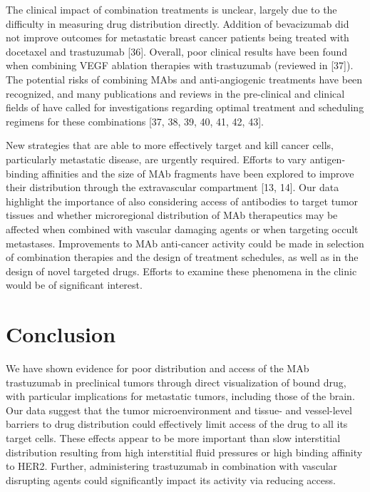 The clinical impact of combination treatments is unclear, largely due to the difficulty in measuring drug distribution directly.
Addition of bevacizumab did not improve outcomes for metastatic breast cancer patients being treated with docetaxel and trastuzumab [36].
Overall, poor clinical results have been found when combining VEGF ablation therapies with trastuzumab (reviewed in [37]).
The potential risks of combining MAbs and anti-angiogenic treatments have been recognized, and many publications and reviews in the pre-clinical and clinical fields of have called for investigations regarding optimal treatment and scheduling regimens for these combinations [37, 38, 39, 40, 41, 42, 43].

New strategies that are able to more effectively target and kill cancer cells, particularly metastatic disease, are urgently required.
Efforts to vary antigen-binding affinities and the size of MAb fragments have been explored to improve their distribution through the extravascular compartment [13, 14].
Our data highlight the importance of also considering access of antibodies to target tumor tissues and whether microregional distribution of MAb therapeutics may be affected when combined with vascular damaging agents or when targeting occult metastases.
Improvements to MAb anti-cancer activity could be made in selection of combination therapies and the design of treatment schedules, as well as in the design of novel targeted drugs.
Efforts to examine these phenomena in the clinic would be of significant interest.

\section{Conclusion}

We have shown evidence for poor distribution and access of the MAb trastuzumab in preclinical tumors through direct visualization of bound drug, with particular implications for metastatic tumors, including those of the brain.
Our data suggest that the tumor microenvironment and tissue- and vessel-level barriers to drug distribution could effectively limit access of the drug to all its target cells.
These effects appear to be more important than slow interstitial distribution resulting from high interstitial fluid pressures or high binding affinity to HER2.
Further, administering trastuzumab in combination with vascular disrupting agents could significantly impact its activity via reducing access.

